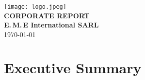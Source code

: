 \documentclass[12pt,a4paper]{article}
\newcommand{\EME}{E.\,M.\,E International SARL}
\begin{document}
\onehalfspacing

\begin{center}
  \vspace*{3cm}
  \texttt{[image: logo.jpeg]}\\[2.5cm]
  {\color{emeCharcoal}\Huge\bfseries CORPORATE REPORT}\\[1.5cm]
  {\Large\textbf{\EME}}\\[1cm]
  \today
\end{center}
\clearpage

\tableofcontents
\clearpage

\section{Executive Summary}
\end{document}
